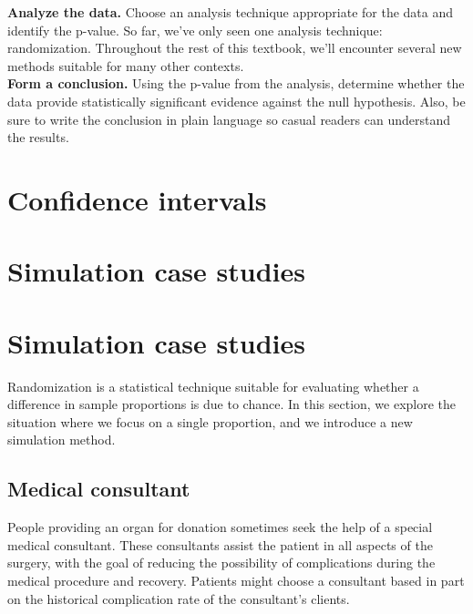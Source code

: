 \noindent\textbf{Analyze the data.} Choose an analysis technique appropriate for the data and identify the p-value. So far, we've only seen one analysis technique: randomization. Throughout the rest of this textbook, we'll encounter several new methods suitable for many other contexts. \\

\noindent\textbf{Form a conclusion.} Using the p-value from the analysis, determine whether the data provide statistically significant evidence against the null hypothesis. Also, be sure to write the conclusion in plain language so casual readers can understand the results.

\textPE{\newpage}


\section{Confidence intervals}


\section{Simulation case studies}

\section{Simulation case studies}
\label{SimulationCaseStudies}

Randomization is a statistical technique suitable for evaluating whether a difference in sample proportions is due to chance. In this section, we explore the situation where we focus on a single proportion, and we introduce a new simulation method.

\subsection{Medical consultant}

People providing an organ for donation sometimes seek the help of a special medical consultant. These consultants assist the patient in all aspects of the surgery, with the goal of reducing the possibility of complications during the medical procedure and recovery. Patients might choose a consultant based in part on the historical complication rate of the consultant's clients.

